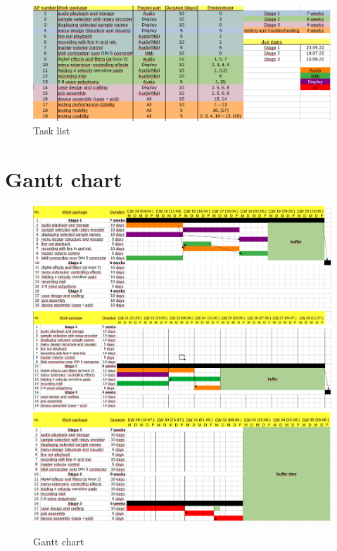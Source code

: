 \begin{figure}[H]
\includegraphics[width=\textwidth]{task_list.png}
\caption{Task list}\label{fig:task}
\end{figure}

\section{Gantt chart}

\begin{figure}[H]
\centering
\includegraphics[width=\textwidth]{gant_chart01.png}
\\
\includegraphics[width=\textwidth]{gant_chart02.png}
\\
\includegraphics[width=\textwidth]{gant_chart03.png}
\caption{Gantt chart}\label{fig:gntt}
\end{figure}

